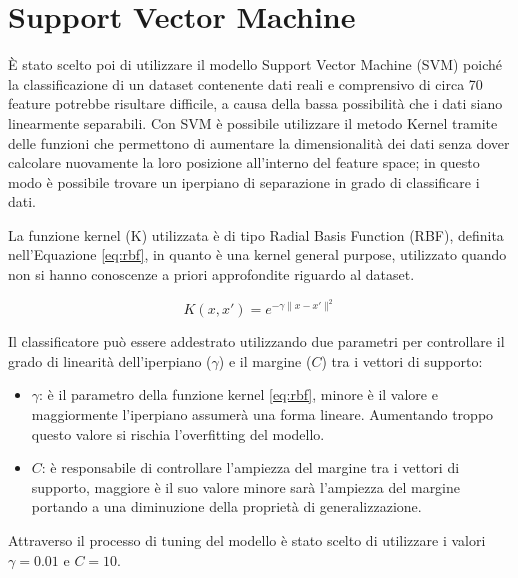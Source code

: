 \section{Support Vector Machine}
È stato scelto poi di utilizzare il modello Support Vector Machine (SVM) poiché 
la classificazione di un dataset contenente dati reali e comprensivo di circa 
70 feature potrebbe risultare difficile, a causa della bassa possibilità che i 
dati siano linearmente separabili. Con SVM è possibile utilizzare il metodo 
Kernel tramite delle funzioni che permettono di aumentare la dimensionalità dei 
dati senza dover calcolare nuovamente la loro posizione all'interno del feature 
space; in questo modo è possibile trovare un iperpiano di separazione in grado 
di classificare i dati.

La funzione kernel (K) utilizzata è di tipo Radial Basis Function (RBF), 
definita nell'Equazione \ref{eq:rbf}, in quanto è una kernel general purpose, 
utilizzato quando non si hanno conoscenze a priori approfondite riguardo al 
dataset.

\begin{equation}\label{eq:rbf}
    K(x, x') = e^{- \gamma \|x - x'\|^2}
\end{equation}

Il classificatore può essere addestrato utilizzando due parametri per 
controllare il grado di linearità dell'iperpiano ($\gamma$) e il margine ($C$) 
tra i vettori di supporto:

\begin{itemize}
    \item $\gamma$: è il parametro della funzione kernel \ref{eq:rbf}, minore è 
    il valore e maggiormente l'iperpiano assumerà una forma lineare. 
    Aumentando troppo questo valore si rischia l'overfitting del modello.
    \item $C$: è responsabile di controllare l'ampiezza del margine tra i 
    vettori di supporto, maggiore è il suo valore minore sarà l'ampiezza del 
    margine portando a una diminuzione della proprietà di generalizzazione.
\end{itemize}

Attraverso il processo di tuning del modello è stato scelto di utilizzare i 
valori $\gamma = 0.01$ e $C = 10$.
